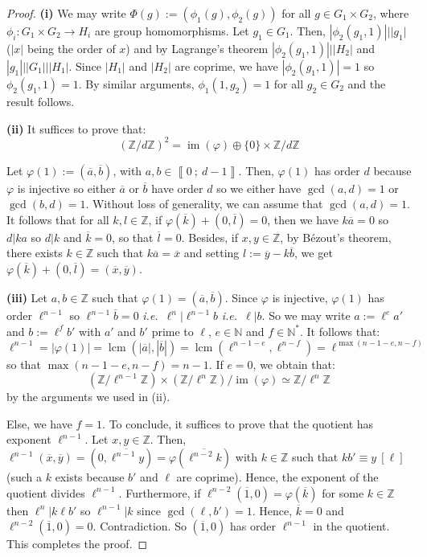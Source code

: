 \documentclass[a4paper,10pt]{report}
\theoremstyle{definition}
\theoremstyle{plain}
\theoremstyle{definition}
\newcommand{\ie}{\emph{i.e.}\ }
\newcommand{\N}{\mathbb{N}}
\newcommand{\Z}{\mathbb{Z}}
\DeclareMathOperator{\im}{im}
\renewcommand{\i}[2]{\left\llbracket #1~;~#2\right\rrbracket}
\renewcommand{\(}{\left(}
\renewcommand{\)}{\right)}
\DeclareMathOperator{\lcm}{lcm}
\begin{document}
\begin{proof}
\textbf{(i)} We may write $\Phi(g):=(\phi_1(g),\phi_2(g))$ for all $g\in G_1\times G_2$, where $\phi_i:G_1\times G_2\longrightarrow H_i$ are group homomorphisms.  Let $g_1\in G_1$. Then, $|\phi_2(g_1,1)|||g_1|$ ($|x|$ being the order of $x$) and by Lagrange's theorem $|\phi_2(g_1,1)|||H_2|$ and $|g_1|||G_1|||H_1|$. Since $|H_1|$ and $|H_2|$ are coprime, we have $|\phi_2(g_1,1)|=1$ so $\phi_2(g_1,1)=1$. By similar arguments, $\phi_1(1,g_2)=1$ for all $g_2\in G_2$ and the result follows.

\textbf{(ii)} It suffices to prove that:
\[ (\Z/d\Z)^2=\im(\varphi)\oplus\{0\}\times\Z/d\Z\]

Let $\varphi(1):=(\overline{a},\overline{b})$, with $a,b\in\i{0}{d-1}$. Then,  $\varphi(1)$ has order $d$ because $\varphi$ is injective so either $\overline{a}$ or $\overline{b}$ have order $d$ so we either have $\gcd(a,d)=1$ or $\gcd(b,d)=1$. Without loss of generality, we can assume that $\gcd(a,d)=1$.  It follows that for all $k,l\in\Z$, if $\varphi(\overline{k})+(0,\overline{l})=0$, then we have $k\overline{a}=0$ so $d|ka$ so $d|k$ and $\overline{k}=0$, so that $\overline{l}=0$. Besides, if $x,y\in\Z$, by B\'{e}zout's theorem, there exists $k\in\Z$ such that $k\overline{a}=\overline{x}$ and setting $l:=\overline{y}-k\overline{b}$, we get $\varphi(\overline{k})+(0,\overline{l})=(\overline{x},\overline{y})$. 

\textbf{(iii)} Let $a,b\in\Z$ such that $\varphi(1)=(\overline{a},\overline{b})$.  Since $\varphi$ is injective, $\varphi(1)$ has order $\ell^{n-1}$ so $\ell^{n-1}\overline{b}=0$ \ie $\ell^n|\ell^{n-1}b$ \ie $\ell|b$. So we may write $a:=\ell^e a'$ and $b:=\ell^f b'$ with $a'$ and $b'$ prime to $\ell$, $e\in\N$ and $f\in\N^*$.  It follows that:
\[\ell^{n-1}=|\varphi(1)|=\lcm(|\overline{a}|,|\overline{b}|)=\lcm(\ell^{n-1-e},\ell^{n-f})=\ell^{\max(n-1-e,n-f)}\]
so that $\max(n-1-e,n-f)=n-1$. If $e=0$, we obtain that:
\[(\Z/\ell^{n-1}\Z)\times(\Z/\ell^{n}\Z)/\im(\varphi)\simeq \Z/\ell^{n}\Z\]
by the arguments we used in (ii). 

Else, we have $f=1$. To conclude, it suffices to prove that the quotient has exponent $\ell^{n-1}$. Let $x,y\in\Z$. Then, $\ell^{n-1}(\overline{x},\overline{y})=(0,\overline{\ell^{n-1}y})=\varphi(\overline{\ell^{n-2}k})$ with $k\in\Z$ such that $kb'\equiv y \ [\ell]$ (such a $k$ exists because $b'$ and $\ell$ are coprime).  Hence, the exponent of the quotient divides $\ell^{n-1}$.  Furthermore, if $\ell^{n-2}(\overline{1},0)=\varphi(\overline{k})$ for some $k\in\Z$ then $\ell^n|k\ell b'$ so $\ell^{n-1}|k$ since $\gcd(\ell,b')=1$. Hence, $\overline{k}=0$ and $\ell^{n-2}(\overline{1},0)=0$. Contradiction. So $(\overline{1},0)$ has order $\ell^{n-1}$ in the quotient. This completes the proof.

\end{proof}
\end{document}
